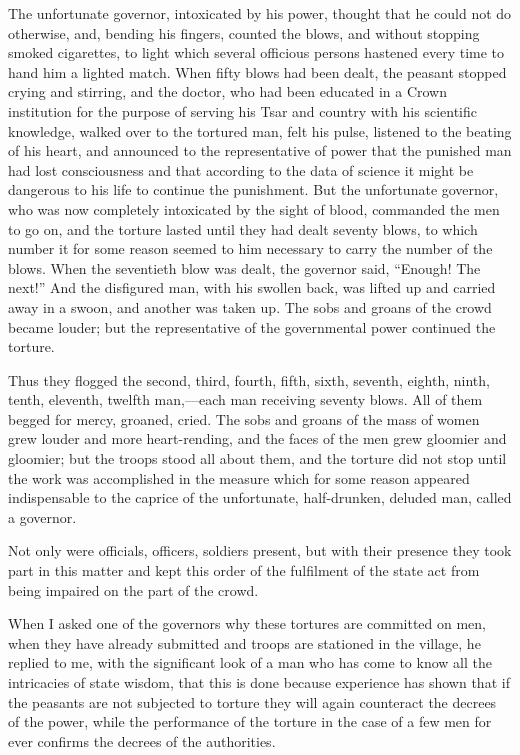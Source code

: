 \documentclass{book}
\begin{document}
The unfortunate governor, intoxicated by his power, thought that he could not do otherwise, and, bending his fingers, counted the blows, and without stopping smoked cigarettes, to light which several officious persons hastened every time to hand him a lighted match. When fifty blows had been dealt, the peasant stopped crying and stirring, and the doctor, who had been educated in a Crown institution for the purpose of serving his Tsar and country with his scientific knowledge, walked over to the tortured man, felt his pulse, listened to the beating of his heart, and announced to the representative of power that the punished man had lost consciousness and that according to the data of science it might be dangerous to his life to continue the punishment. But the unfortunate governor, who was now completely intoxicated by the sight of blood, commanded the men to go on, and the torture lasted until they had dealt seventy blows, to which number it for some reason seemed to him necessary to carry the number of the blows. When the seventieth blow was dealt, the governor said, “Enough! The next!” And the disfigured man, with his swollen back, was lifted up and carried away in a swoon, and another was taken up. The sobs and groans of the crowd became louder; but the representative of the governmental power continued the torture.

Thus they flogged the second, third, fourth, fifth, sixth, seventh, eighth, ninth, tenth, eleventh, twelfth man,—each man receiving seventy blows. All of them begged for mercy, groaned, cried. The sobs and groans of the mass of women grew louder and more heart-rending, and the faces of the men grew gloomier and gloomier; but the troops stood all about them, and the torture did not stop until the work was accomplished in the measure which for some reason appeared indispensable to the caprice of the unfortunate, half-drunken, deluded man, called a governor.

Not only were officials, officers, soldiers present, but with their presence they took part in this matter and kept this order of the fulfilment of the state act from being impaired on the part of the crowd.

When I asked one of the governors why these tortures are committed on men, when they have already submitted and troops are stationed in the village, he replied to me, with the significant look of a man who has come to know all the intricacies of state wisdom, that this is done because experience has shown that if the peasants are not subjected to torture they will again counteract the decrees of the power, while the performance of the torture in the case of a few men for ever confirms the decrees of the authorities.
\end{document}
